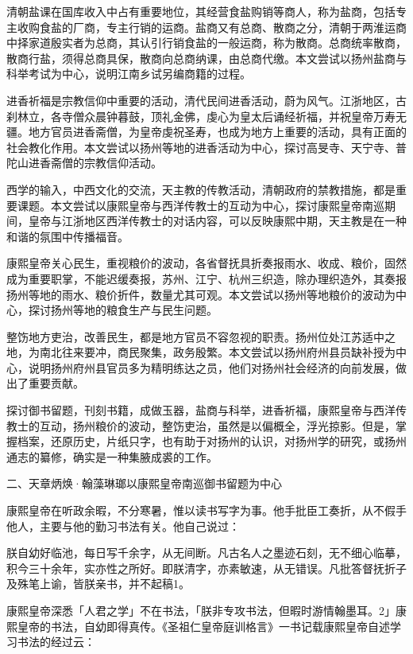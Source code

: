 清朝盐课在国库收入中占有重要地位，其经营食盐购销等商人，称为盐商，包括专主收购食盐的厂商，专主行销的运商。盐商又有总商、散商之分，清朝于两淮运商中择家道殷实者为总商，其认引行销食盐的一般运商，称为散商。总商统率散商，散商行盐，须得总商具保，散商向总商纳课，由总商代缴。本文尝试以扬州盐商与科举考试为中心，说明江南乡试另编商籍的过程。

进香祈福是宗教信仰中重要的活动，清代民间进香活动，蔚为风气。江浙地区，古刹林立，各寺僧众晨钟暮鼓，顶礼金佛，虔心为皇太后诵经祈福，并祝皇帝万寿无疆。地方官员进香斋僧，为皇帝虔祝圣寿，也成为地方上重要的活动，具有正面的社会教化作用。本文尝试以扬州等地的进香活动为中心，探讨高旻寺、天宁寺、普陀山进香斋僧的宗教信仰活动。

西学的输入，中西文化的交流，天主教的传教活动，清朝政府的禁教措施，都是重要课题。本文尝试以康熙皇帝与西洋传教士的互动为中心，探讨康熙皇帝南巡期间，皇帝与江浙地区西洋传教士的对话内容，可以反映康熙中期，天主教是在一种和谐的氛围中传播福音。


康熙皇帝关心民生，重视粮价的波动，各省督抚具折奏报雨水、收成、粮价，固然成为重要职掌，不能迟缓奏报，苏州、江宁、杭州三织造，除办理织造外，其奏报扬州等地的雨水、粮价折件，数量尤其可观。本文尝试以扬州等地粮价的波动为中心，探讨扬州等地的粮食生产与民生问题。

整饬地方吏治，改善民生，都是地方官员不容忽视的职责。扬州位处江苏适中之地，为南北往来要冲，商民聚集，政务殷繁。本文尝试以扬州府州县员缺补授为中心，说明扬州府州县官员多为精明练达之员，他们对扬州社会经济的向前发展，做出了重要贡献。

探讨御书留题，刊刻书籍，成做玉器，盐商与科举，进香祈福，康熙皇帝与西洋传教士的互动，扬州粮价的波动，整饬吏治，虽然是以偏概全，浮光掠影。但是，掌握档案，还原历史，片纸只字，也有助于对扬州的认识，对扬州学的研究，或扬州通志的纂修，确实是一种集腋成裘的工作。

二、天章炳焕·翰藻琳瑯以康熙皇帝南巡御书留题为中心

康熙皇帝在听政余暇，不分寒暑，惟以读书写字为事。他手批臣工奏折，从不假手他人，主要与他的勤习书法有关。他自己说过：

\begin{BookQuote}
朕自幼好临池，每日写千余字，从无间断。凡古名人之墨迹石刻，无不细心临摹，积今三十余年，实亦性之所好。即朕清字，亦素敏速，从无错误。凡批答督抚折子及殊笔上谕，皆朕亲书，并不起稿1。
\end{BookQuote}

康熙皇帝深悉「人君之学」不在书法，「朕非专攻书法，但暇时游情翰墨耳。2」康熙皇帝的书法，自幼即得真传。《圣祖仁皇帝庭训格言》一书记载康熙皇帝自述学习书法的经过云：

